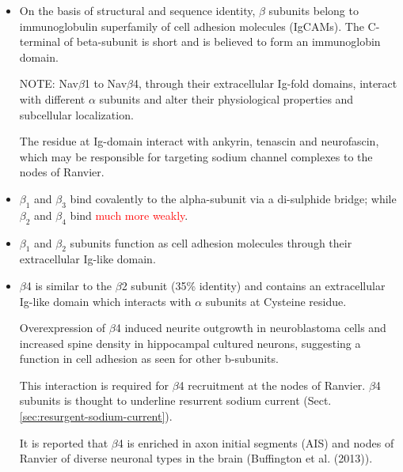 \begin{itemize}
  
  \item On the basis of structural and sequence identity, $\beta$
  subunits belong to immunoglobulin superfamily of cell adhesion molecules
  (IgCAMs). The C-terminal of beta-subunit is short and is believed to form an
  immunoglobin domain.

 NOTE: Nav$\beta$1 to Nav$\beta$4, through their extracellular Ig-fold
domains, interact with different $\alpha$ subunits and alter their physiological
properties and subcellular localization.

The residue at Ig-domain interact with ankyrin, tenascin and neurofascin, which
may be responsible for targeting sodium channel complexes to the nodes of
Ranvier.

  \item $\beta_1$ and $\beta_3$ bind covalently to the alpha-subunit via a
  di-sulphide bridge; while $\beta_2$ and $\beta_4$ bind \textcolor{red}{much
  more weakly}.
  
  \item $\beta_1$ and $\beta_2$ subunits function as cell adhesion molecules
  through their extracellular Ig-like domain.

  
  \item $\beta$4 is similar to the $\beta$2 subunit (35\% identity) and contains
  an extracellular Ig-like domain which interacts with $\alpha$ subunits at
  Cysteine  residue.

Overexpression of $\beta$4 induced neurite outgrowth in neuroblastoma cells and
increased spine density in hippocampal cultured neurons, suggesting a
function in cell adhesion as seen for other b-subunits.

This interaction is required for $\beta$4 recruitment at the nodes of Ranvier.
$\beta$4 subunits is thought to underline resurrent sodium current
(Sect.\ref{sec:resurgent-sodium-current}).

It is reported that $\beta$4 is enriched in axon initial segments (AIS) and
nodes of Ranvier of diverse neuronal types in the brain (Buffington et al.
(2013)).


 
\end{itemize}



